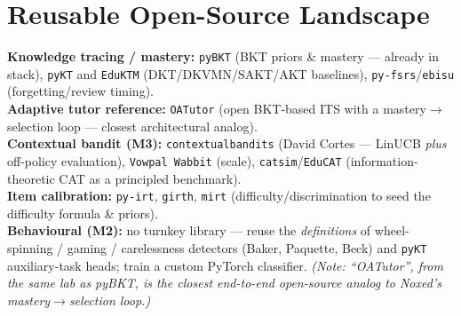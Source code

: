 \documentclass[11pt]{article}
\begin{document}
\section{Reusable Open-Source Landscape}
\textbf{Knowledge tracing / mastery:} \texttt{pyBKT} (BKT priors \& mastery --- already in stack), \texttt{pyKT} and \texttt{EduKTM} (DKT/DKVMN/SAKT/AKT baselines), \texttt{py-fsrs}/\texttt{ebisu} (forgetting/review timing).\\
\textbf{Adaptive tutor reference:} \texttt{OATutor} (open BKT-based ITS with a mastery$\rightarrow$selection loop --- closest architectural analog).\\
\textbf{Contextual bandit (M3):} \texttt{contextualbandits} (David Cortes --- LinUCB \emph{plus} off-policy evaluation), \texttt{Vowpal Wabbit} (scale), \texttt{catsim}/\texttt{EduCAT} (information-theoretic CAT as a principled benchmark).\\
\textbf{Item calibration:} \texttt{py-irt}, \texttt{girth}, \texttt{mirt} (difficulty/discrimination to seed the difficulty formula \& priors).\\
\textbf{Behavioural (M2):} no turnkey library --- reuse the \emph{definitions} of wheel-spinning / gaming / carelessness detectors (Baker, Paquette, Beck) and \texttt{pyKT} auxiliary-task heads; train a custom PyTorch classifier. \emph{(Note: ``OATutor'', from the same lab as pyBKT, is the closest end-to-end open-source analog to Noxed's mastery$\rightarrow$selection loop.)}

\end{document}
